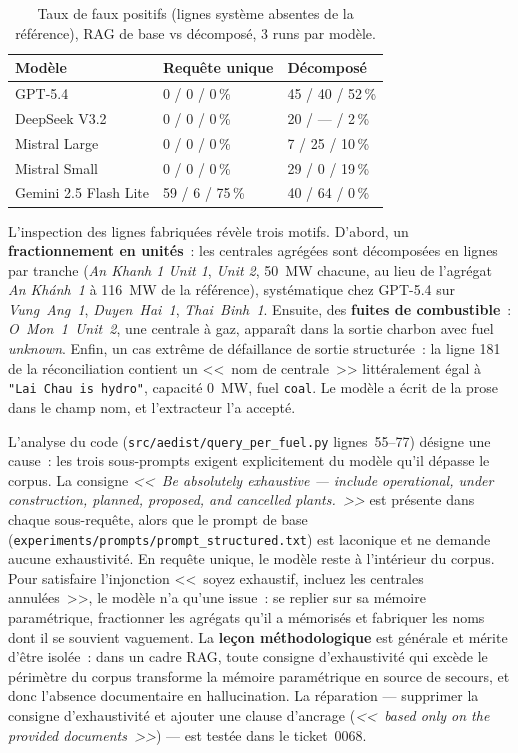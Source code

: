 \documentclass[a4paper,11pt]{report}
\begin{document}
\begin{table}[htbp]
\centering
\caption{Taux de faux positifs (lignes système absentes de la référence), RAG de base vs décomposé, 3 runs par modèle.}\label{tab:decomposition-fp}
\begin{tabular}{@{}lll@{}}
\toprule
Modèle & Requête unique & Décomposé \\
\midrule
GPT-5.4             & 0 / 0 / 0\,\%   & 45 / 40 / 52\,\% \\
DeepSeek V3.2       & 0 / 0 / 0\,\%   & 20 / --- / 2\,\% \\
Mistral Large       & 0 / 0 / 0\,\%   & 7 / 25 / 10\,\% \\
Mistral Small       & 0 / 0 / 0\,\%   & 29 / 0 / 19\,\% \\
Gemini 2.5 Flash Lite & 59 / 6 / 75\,\% & 40 / 64 / 0\,\% \\
\bottomrule
\end{tabular}
\end{table}

L'inspection des lignes fabriquées révèle trois motifs. D'abord, un \textbf{fractionnement en unités}~: les centrales agrégées sont décomposées en lignes par tranche (\textit{An Khanh 1 Unit 1}, \textit{Unit 2}, 50~MW chacune, au lieu de l'agrégat \textit{An Khánh~1} à 116~MW de la référence), systématique chez GPT-5.4 sur \textit{Vung~Ang~1}, \textit{Duyen~Hai~1}, \textit{Thai~Binh~1}. Ensuite, des \textbf{fuites de combustible}~: \textit{O~Mon~1~Unit~2}, une centrale à gaz, apparaît dans la sortie charbon avec fuel \textit{unknown}. Enfin, un cas extrême de défaillance de sortie structurée~: la ligne 181 de la réconciliation contient un <<~nom de centrale~>> littéralement égal à \texttt{"Lai~Chau~is~hydro"}, capacité 0~MW, fuel \texttt{coal}. Le modèle a écrit de la prose dans le champ nom, et l'extracteur l'a accepté.

L'analyse du code (\texttt{src/aedist/query\_per\_fuel.py} lignes~55--77) désigne une cause~: les trois sous-prompts exigent explicitement du modèle qu'il dépasse le corpus. La consigne \textit{<<~Be absolutely exhaustive --- include operational, under construction, planned, proposed, and cancelled plants.~>>} est présente dans chaque sous-requête, alors que le prompt de base (\texttt{experiments/prompts/prompt\_structured.txt}) est laconique et ne demande aucune exhaustivité. En requête unique, le modèle reste à l'intérieur du corpus. Pour satisfaire l'injonction <<~soyez exhaustif, incluez les centrales annulées~>>, le modèle n'a qu'une issue~: se replier sur sa mémoire paramétrique, fractionner les agrégats qu'il a mémorisés et fabriquer les noms dont il se souvient vaguement. La \textbf{leçon méthodologique} est générale et mérite d'être isolée~: dans un cadre RAG, toute consigne d'exhaustivité qui excède le périmètre du corpus transforme la mémoire paramétrique en source de secours, et donc l'absence documentaire en hallucination. La réparation — supprimer la consigne d'exhaustivité et ajouter une clause d'ancrage (\textit{<<~based only on the provided documents~>>}) — est testée dans le ticket~0068.
\end{document}
